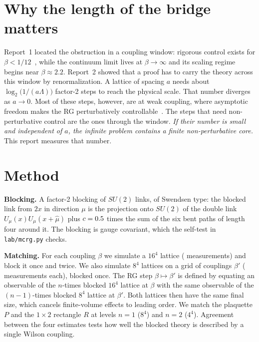 \documentclass[11pt,a4paper]{article}
\begin{document}
\section{Why the length of the bridge matters}
Report~1 located the obstruction in a coupling window: rigorous control exists for $\beta<1/12$~\cite{SZZ23}, while the continuum limit lives at $\beta\to\infty$ and its scaling regime begins near $\beta\approx2.2$. Report~2 showed that a proof has to carry the theory across this window by renormalization. A lattice of spacing $a$ needs about $\log_2\bigl(1/(a\Lambda)\bigr)$ factor-2 steps to reach the physical scale. That number diverges as $a\to0$. Most of these steps, however, are at weak coupling, where asymptotic freedom makes the RG perturbatively controllable~\cite{Bal87,Bal88,Bal89a,Bal89b}. The steps that need non-perturbative control are the ones through the window. \emph{If their number is small and independent of $a$, the infinite problem contains a finite non-perturbative core.} This report measures that number.

\section{Method}
\textbf{Blocking.} A factor-2 blocking of $SU(2)$ links, of Swendsen type: the blocked link from $2x$ in direction $\mu$ is the projection onto $SU(2)$ of the double link $U_\mu(x)U_\mu(x+\hat\mu)$ plus $c=0.5$ times the sum of the six bent paths of length four around it. The blocking is gauge covariant, which the self-test in \texttt{lab/mcrg.py} checks.

\textbf{Matching.} For each coupling $\beta$ we simulate a $16^4$ lattice (\McrgMeasBig{} measurements) and block it once and twice. We also simulate $8^4$ lattices on a grid of \McrgNumSmall{} couplings $\beta'$ (\McrgMeasSmall{} measurements each), blocked once. The RG step $\beta\mapsto\beta'$ is defined by equating an observable of the $n$-times blocked $16^4$ lattice at $\beta$ with the same observable of the $(n-1)$-times blocked $8^4$ lattice at $\beta'$. Both lattices then have the same final size, which cancels finite-volume effects to leading order. We match the plaquette $P$ and the $1\times2$ rectangle $R$ at levels $n=1$ ($8^4$) and $n=2$ ($4^4$). Agreement between the four estimates tests how well the blocked theory is described by a single Wilson coupling.

\end{document}
